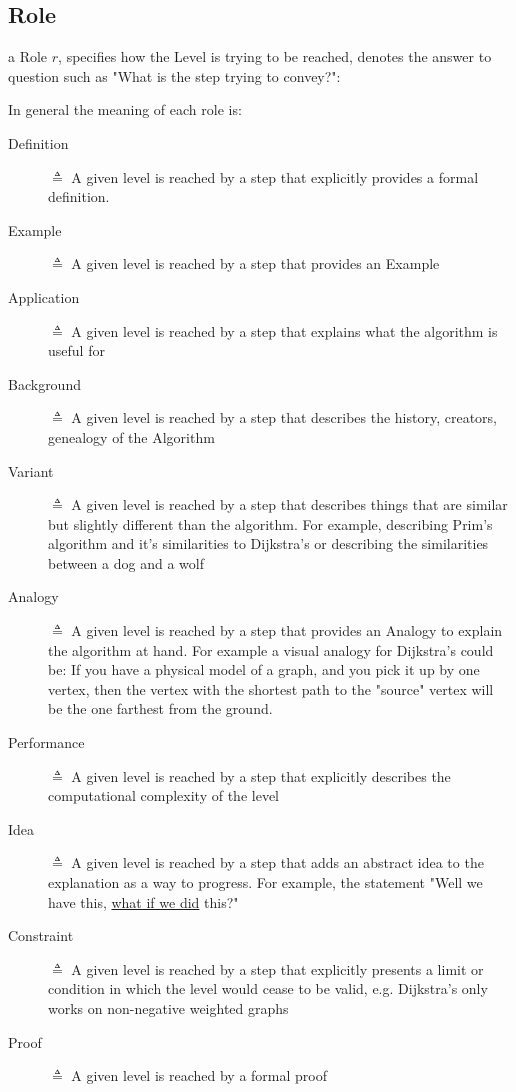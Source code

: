 \documentclass[10pt, letterpaper]{article}
\begin{document}
\subsection*{Role}
\label{sec:orgb8ef15e}
a Role \(r\), specifies how the Level is trying to be reached, denotes the
answer to question such as "What is the step trying to convey?":

In general the meaning of each role is:
\begin{description}
\item[{Definition}] \(\triangleq\) A given level is reached by a step that explicitly provides a
formal definition.
\item[{Example}] \(\triangleq\) A given level is reached by a step that provides an Example
\item[{Application}] \(\triangleq\) A given level is reached by a step that explains what the
algorithm is useful for
\item[{Background}] \(\triangleq\) A given level is reached by a step that describes the history,
creators, genealogy of the Algorithm
\item[{Variant}] \(\triangleq\) A given level is reached by a step that describes things that are
similar but slightly different than the algorithm. For example, describing
Prim's algorithm and it's similarities to Dijkstra's or describing the
similarities between a dog and a wolf
\item[{Analogy}] \(\triangleq\) A given level is reached by a step that provides an Analogy to
explain the algorithm at hand. For example a visual analogy for Dijkstra's
could be: If you have a physical model of a graph, and you pick it up by
one vertex, then the vertex with the shortest path to the "source" vertex
will be the one farthest from the ground.
\item[{Performance}] \(\triangleq\) A given level is reached by a step that explicitly describes
the computational complexity of the level
\item[{Idea}] \(\triangleq\) A given level is reached by a step that adds an abstract idea to the
explanation as a way to progress. For example, the statement "Well we have
this, \uline{what if we did} this?"
\item[{Constraint}] \(\triangleq\) A given level is reached by a step that explicitly presents a
limit or condition in which the level would cease to be valid, e.g.
Dijkstra's only works on non-negative weighted graphs
\item[{Proof}] \(\triangleq\) A given level is reached by a formal proof
\end{description}
\end{document}
